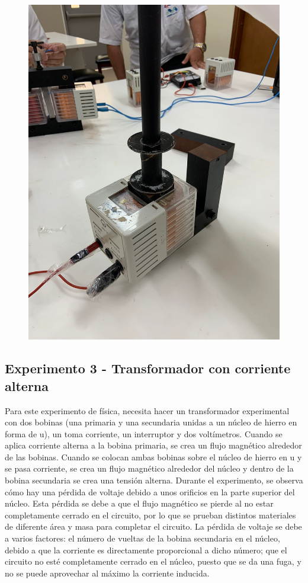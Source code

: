 \documentclass[twocolumn, 12pt]{article}
\begin{document}
\begin{figure}[H]
	\includegraphics*[width=0.9\linewidth]{./Images/Electroiman2.jpeg}
\end{figure}

\subsection*{Experimento 3 - Transformador con corriente alterna}

Para este experimento de física, necesita hacer un
transformador experimental con dos bobinas (una primaria y
una secundaria unidas a un núcleo de hierro en forma de u),
un toma corriente, un interruptor y dos voltímetros. Cuando
se aplica corriente alterna a la bobina primaria, se crea
un flujo magnético alrededor de las bobinas. Cuando se
colocan ambas bobinas sobre el núcleo de hierro en u y se
pasa corriente, se crea un flujo magnético alrededor del
núcleo y dentro de la bobina secundaria se crea una tensión
alterna. Durante el experimento, se observa cómo hay una
pérdida de voltaje debido a unos orificios en la parte
superior del núcleo. Esta pérdida se debe a que el flujo
magnético se pierde al no estar completamente cerrado en el
circuito, por lo que se prueban distintos materiales de
diferente área y masa para completar el circuito. La
pérdida de voltaje se debe a varios factores: el número de
vueltas de la bobina secundaria en el núcleo, debido a que
la corriente es directamente proporcional a dicho número;
que el circuito no esté completamente cerrado en el núcleo,
puesto que se da una fuga, y no se puede aprovechar al
máximo la corriente inducida.
\end{document}

